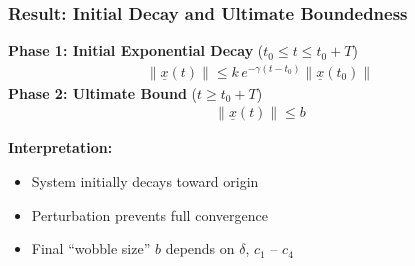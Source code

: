 \documentclass[student, noshadow, lsr, english, aspectratio=169, t]{ITR_LSR_slides}
\begin{document}
\begin{frame}
    \frametitle{Result: Initial Decay and Ultimate Boundedness}

    \vspace{-0.4cm}
    \begin{tcolorbox}[title=For $\|\underline{x}(t_0)\| \leq \sqrt{c_1/c_2} \, r$]
        \textbf{Phase 1: Initial Exponential Decay} \quad ($t_0 \leq t \leq t_0 + T$)
        \begin{align*}
            \|\underline{x}(t)\| \leq k\, e^{-\gamma (t - t_0)} \|\underline{x}(t_0)\|
        \end{align*}
        \textbf{Phase 2: Ultimate Bound} \quad ($t \geq t_0 + T$)
        \begin{align*}
            \|\underline{x}(t)\| \leq b
        \end{align*}
    \end{tcolorbox}

    \vspace{0.2cm}
    \textbf{Interpretation:}
    \begin{itemize}
        \item System initially decays toward origin
        \item Perturbation prevents full convergence
        \item Final “wobble size” $b$ depends on $\delta$, $c_1$ – $c_4$
    \end{itemize}

\end{frame}
\end{document}

